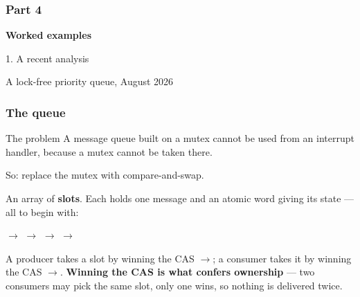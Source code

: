 \begin{frame}
  \frametitle{Part 4}

{\Large\bf Worked examples}

\vspace{0.5cm}

{\large 1. A recent analysis}

\vspace{0.25cm}

{\small A lock-free priority queue, August 2026}

\end{frame}

\begin{frame}[fragile]
  \frametitle{The queue} \small

\begin{block}{The problem}\small
A message queue built on a mutex cannot be used from an interrupt handler, because
a mutex cannot be taken there.
\end{block}

\vspace{0.15cm}

So: replace the mutex with compare-and-swap.

\vspace{0.15cm}

An array of  {\bf slots}. Each holds one message and an atomic word
giving its state --- all  to begin with:

\vspace{0.25cm}

{\centering
{}\par}

\vspace{0.3cm}

{\centering\small
{} $\to$  $\to$  $\to$
 $\to$ \par}

\vspace{0.25cm}

A producer takes a slot by winning the CAS $\to$;
a consumer takes it by winning the CAS $\to$. {\bf Winning
the CAS is what confers ownership} --- two consumers may pick the same slot, only
one wins, so nothing is delivered twice.

\end{frame}

